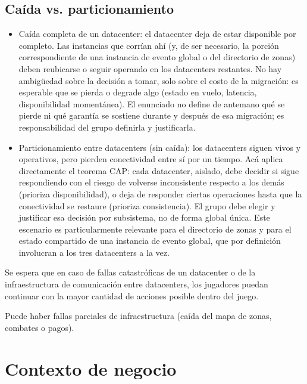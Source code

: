 \documentclass[variant=guia,cover=institutional,mode=screen]{ua-engineering-v6-article}
\begin{document}
    \subsection{Caída vs. particionamiento}\label{subsec:caida-particionamiento}

    \begin{itemize}
        \item Caída completa de un datacenter: el datacenter deja de estar disponible por completo.
        Las instancias que corrían ahí (y, de ser necesario, la porción correspondiente de una instancia de evento global o del directorio de zonas) deben reubicarse o seguir operando en los datacenters restantes.
        No hay ambigüedad sobre la decisión a tomar, solo sobre el costo de la migración: es esperable que se pierda o degrade algo (estado en vuelo, latencia, disponibilidad momentánea).
        El enunciado no define de antemano qué se pierde ni qué garantía se sostiene durante y después de esa migración; es responsabilidad del grupo definirla y justificarla.
        \item Particionamiento entre datacenters (sin caída): los datacenters siguen vivos y operativos, pero pierden conectividad entre sí por un tiempo.
        Acá aplica directamente el teorema CAP: cada datacenter, aislado, debe decidir si sigue respondiendo con el riesgo de volverse inconsistente respecto a los demás (prioriza disponibilidad), o deja de responder ciertas operaciones hasta que la conectividad se restaure (prioriza consistencia).
        El grupo debe elegir y justificar esa decisión por subsistema, no de forma global única.
        Este escenario es particularmente relevante para el directorio de zonas y para el estado compartido de una instancia de evento global, que por definición involucran a los tres datacenters a la vez.
    \end{itemize}

    Se espera que en caso de fallas catastróficas de un datacenter o de la infraestructura de comunicación entre datacenters, los jugadores puedan continuar con la mayor cantidad de acciones posible dentro del juego.
  
    Puede haber fallas parciales de infraestructura (caída del mapa de zonas, combates o pagos).

    \section{Contexto de negocio}\label{sec:contexto-negocio}
\end{document}
